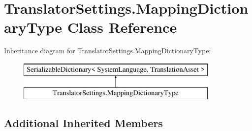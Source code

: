 \hypertarget{class_translator_settings_1_1_mapping_dictionary_type}{}\section{Translator\+Settings.\+Mapping\+Dictionary\+Type Class Reference}
\label{class_translator_settings_1_1_mapping_dictionary_type}
Inheritance diagram for Translator\+Settings.\+Mapping\+Dictionary\+Type\+:\begin{figure}[H]
\begin{center}
\leavevmode
\includegraphics[height=2.000000cm]{class_translator_settings_1_1_mapping_dictionary_type}
\end{center}
\end{figure}
\subsection*{Additional Inherited Members}
